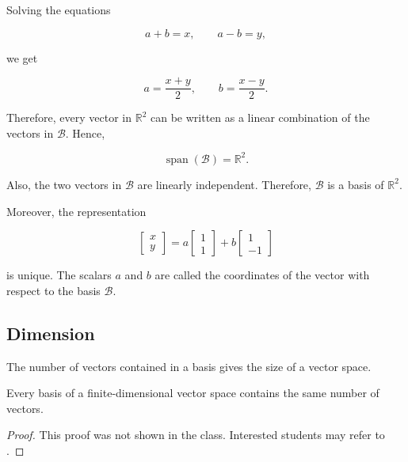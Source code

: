 \begin{example}
	Solving the equations

	\begin{equation}
		a+b=x,\qquad a-b=y,
		\label{eq:basis-and-dimension-of-r-19}
	\end{equation}

	we get

	\begin{equation}
		a=\frac{x+y}{2},
		\qquad
		b=\frac{x-y}{2}.
		\label{eq:basis-and-dimension-of-r-20}
	\end{equation}

	Therefore, every vector in \(\mathbb{R}^2\) can be written as a linear
	combination of the vectors in \(\mathcal{B}\). Hence,

	\begin{equation}
		\operatorname{span}(\mathcal{B})=\mathbb{R}^2.
		\label{eq:basis-and-dimension-of-r-21}
	\end{equation}

	Also, the two vectors in \(\mathcal{B}\) are linearly independent. Therefore,
	\(\mathcal{B}\) is a basis of \(\mathbb{R}^2\).

	Moreover, the representation

	\begin{equation}
		\begin{bmatrix}
			x \\
			y
		\end{bmatrix}
		=
		a
		\begin{bmatrix}
			1 \\
			1
		\end{bmatrix}
		+
		b
		\begin{bmatrix}
			1 \\
			-1
		\end{bmatrix}
		\label{eq:basis-and-dimension-of-r-22}
	\end{equation}

	is unique. The scalars \(a\) and \(b\) are called the coordinates of the vector
	with respect to the basis \(\mathcal{B}\).
\end{example}

\subsection{Dimension}

The number of vectors contained in a basis gives the size of a vector space.

\begin{theorem}
	Every basis of a finite-dimensional vector space contains the same number of
	vectors.
\end{theorem}
\begin{proof}
	This proof was not shown in the class. Interested students may refer to \cite[p. 44]{axler2024linear}.
\end{proof}


